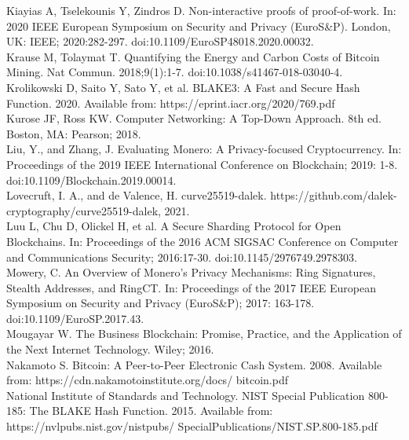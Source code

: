 \documentclass[12pt,a4paper,twocolumn]{article}
\begin{document}
Kiayias A, Tselekounis Y, Zindros D. Non-interactive proofs of proof-of-work. In: 2020 IEEE European Symposium on Security and Privacy (EuroS\&P). London, UK: IEEE; 2020:282-297. doi:10.1109/EuroSP48018.2020.00032.\\

Krause M, Tolaymat T. Quantifying the Energy and Carbon Costs of Bitcoin Mining. Nat Commun. 2018;9(1):1-7. doi:10.1038/s41467-018-03040-4.\\

Krolikowski D, Saito Y, Sato Y, et al. BLAKE3: A Fast and Secure Hash Function. 2020. Available from: https://eprint.iacr.org/2020/769.pdf\\

Kurose JF, Ross KW. Computer Networking: A Top-Down Approach. 8th ed. Boston, MA: Pearson; 2018.\\

Liu, Y., and Zhang, J. Evaluating Monero: A Privacy-focused Cryptocurrency. In: Proceedings of the 2019 IEEE International Conference on Blockchain; 2019: 1-8. doi:10.1109/Blockchain.2019.00014.\\

Lovecruft, I. A., and de Valence, H. curve25519-dalek. https://github.com/dalek-cryptography/curve25519-dalek, 2021.\\

Luu L, Chu D, Olickel H, et al. A Secure Sharding Protocol for Open Blockchains. In: Proceedings of the 2016 ACM SIGSAC Conference on Computer and Communications Security; 2016:17-30. doi:10.1145/2976749.2978303.\\

Mowery, C. An Overview of Monero's Privacy Mechanisms: Ring Signatures, Stealth Addresses, and RingCT. In: Proceedings of the 2017 IEEE European Symposium on Security and Privacy (EuroS\&P); 2017: 163-178. doi:10.1109/EuroSP.2017.43.\\

Mougayar W. The Business Blockchain: Promise, Practice, and the Application of the Next Internet Technology. Wiley; 2016.\\

Nakamoto S. Bitcoin: A Peer-to-Peer Electronic Cash System. 2008. Available from: https://cdn.nakamotoinstitute.org/docs/ bitcoin.pdf \\

National Institute of Standards and Technology. NIST Special Publication 800-185: The BLAKE Hash Function. 2015. Available from: https://nvlpubs.nist.gov/nistpubs/ SpecialPublications/NIST.SP.800-185.pdf \\
\end{document}
